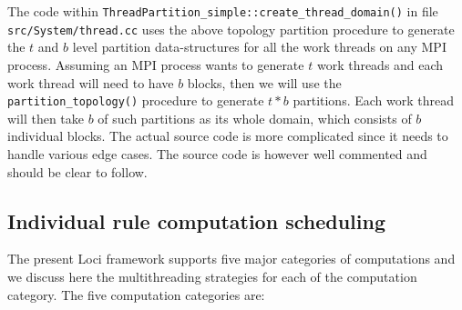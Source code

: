 \documentclass{article}
\begin{document}
The code within
\lstinline{ThreadPartition_simple::create_thread_domain()} in file
\texttt{src/System/thread.cc} uses the above topology partition
procedure to generate the $t$ and $b$ level partition data-structures
for all the work threads on any MPI process.  Assuming an MPI process
wants to generate $t$ work threads and each work thread will need to
have $b$ blocks, then we will use the \lstinline{partition_topology()}
procedure to generate $t*b$ partitions.  Each work thread will then take
$b$ of such partitions as its whole domain, which consists of $b$
individual blocks.  The actual source code is more complicated since it
needs to handle various edge cases.  The source code is however well
commented and should be clear to follow.

\subsection{Individual rule computation scheduling}
\label{sec:rule-impl}
The present Loci framework supports five major categories of
computations and we discuss here the multithreading strategies for each
of the computation category.  The five computation categories are:
\end{document}
